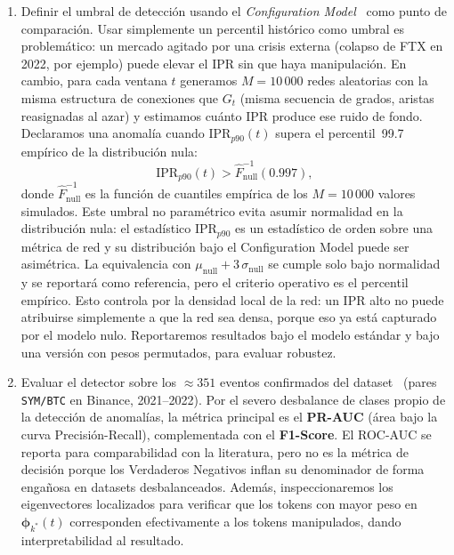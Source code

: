 \begin{enumerate}
  \item Definir el umbral de detección usando el \emph{Configuration
        Model}~\cite{newman2003} como punto de comparación. Usar simplemente
        un percentil histórico como umbral es problemático: un mercado agitado
        por una crisis externa (colapso de FTX en 2022, por ejemplo) puede
        elevar el IPR sin que haya manipulación. En cambio, para cada ventana
        $t$ generamos $M = 10\,000$ redes aleatorias con la misma estructura de
        conexiones que $G_t$ (misma secuencia de grados, aristas reasignadas al
        azar) y estimamos cuánto IPR produce ese ruido de fondo. Declaramos
        una anomalía cuando $\mathrm{IPR}_{p90}(t)$ supera el percentil~99.7
        empírico de la distribución nula:
        \begin{equation}
          \mathrm{IPR}_{p90}(t) > \hat{F}_{\text{null}}^{-1}(0.997),
          \label{eq:threshold}
        \end{equation}
        donde $\hat{F}_{\text{null}}^{-1}$ es la función de cuantiles empírica
        de los $M = 10\,000$ valores simulados. Este umbral no paramétrico evita
        asumir normalidad en la distribución nula: el estadístico
        $\mathrm{IPR}_{p90}$ es un estadístico de orden sobre una métrica de
        red y su distribución bajo el Configuration Model puede ser asimétrica.
        La equivalencia con $\mu_{\text{null}} + 3\,\sigma_{\text{null}}$
        se cumple solo bajo normalidad y se reportará como referencia, pero
        el criterio operativo es el percentil empírico. Esto controla por la
        densidad local de la red: un IPR alto no puede atribuirse simplemente
        a que la red sea densa, porque eso ya está capturado por el modelo
        nulo. Reportaremos resultados bajo el modelo estándar y bajo una
        versión con pesos permutados, para evaluar robustez.

  \item Evaluar el detector sobre los ${\approx}351$ eventos confirmados del
        dataset~\cite{lamorgia2020} (pares \texttt{SYM/BTC} en Binance,
        2021--2022). Por el severo desbalance de clases propio de la detección
        de anomalías, la métrica principal es el \textbf{PR-AUC} (área bajo la
        curva Precisión-Recall), complementada con el \textbf{F1-Score}. El
        ROC-AUC se reporta para comparabilidad con la literatura, pero no es la
        métrica de decisión porque los Verdaderos Negativos inflan su
        denominador de forma engañosa en datasets desbalanceados. Además,
        inspeccionaremos los eigenvectores localizados para verificar que los
        tokens con mayor peso en $\boldsymbol{\phi}_{k^*}(t)$ corresponden
        efectivamente a los tokens manipulados, dando interpretabilidad al
        resultado.

\end{enumerate}
